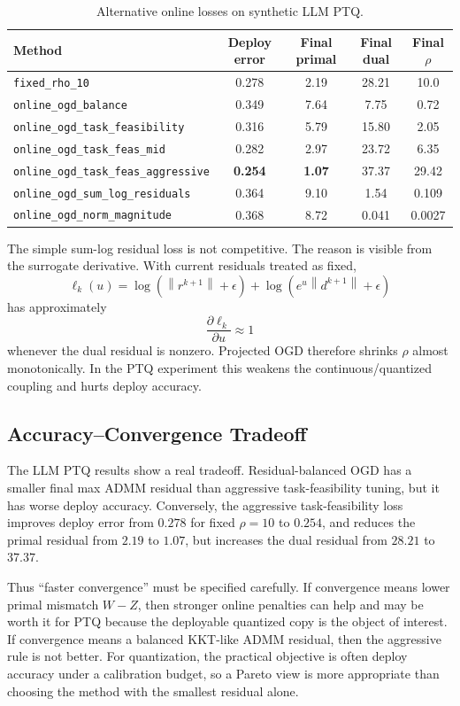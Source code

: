 \documentclass[11pt]{article}
\newcommand{\norm}[1]{\left\lVert #1 \right\rVert}
\begin{document}
\begin{table}[h]
\centering
\caption{Alternative online losses on synthetic LLM PTQ.}
\label{tab:llm-loss-sweep}
\begin{tabular}{lcccc}
\toprule
Method & Deploy error & Final primal & Final dual & Final \(\rho\)\\
\midrule
\texttt{fixed\_rho\_10} & 0.278 & 2.19 & 28.21 & 10.0\\
\texttt{online\_ogd\_balance} & 0.349 & 7.64 & 7.75 & 0.72\\
\texttt{online\_ogd\_task\_feasibility} & 0.316 & 5.79 & 15.80 & 2.05\\
\texttt{online\_ogd\_task\_feas\_mid} & 0.282 & 2.97 & 23.72 & 6.35\\
\texttt{online\_ogd\_task\_feas\_aggressive} & \textbf{0.254} & \textbf{1.07} & 37.37 & 29.42\\
\texttt{online\_ogd\_sum\_log\_residuals} & 0.364 & 9.10 & 1.54 & 0.109\\
\texttt{online\_ogd\_norm\_magnitude} & 0.368 & 8.72 & 0.041 & 0.0027\\
\bottomrule
\end{tabular}
\end{table}

The simple sum-log residual loss is not competitive.  The reason is visible
from the surrogate derivative.  With current residuals treated as fixed,
\[
    \ell_k(u)
    =
    \log(\norm{r^{k+1}}+\epsilon)
    +
    \log(e^u\norm{d^{k+1}}+\epsilon)
\]
has approximately
\[
    \frac{\partial \ell_k}{\partial u}\approx 1
\]
whenever the dual residual is nonzero.  Projected OGD therefore shrinks
\(\rho\) almost monotonically.  In the PTQ experiment this weakens the
continuous/quantized coupling and hurts deploy accuracy.

\subsection{Accuracy--Convergence Tradeoff}

The LLM PTQ results show a real tradeoff.  Residual-balanced OGD has a smaller
final max ADMM residual than aggressive task-feasibility tuning, but it has
worse deploy accuracy.  Conversely, the aggressive task-feasibility loss
improves deploy error from \(0.278\) for fixed \(\rho=10\) to \(0.254\), and
reduces the primal residual from \(2.19\) to \(1.07\), but increases the dual
residual from \(28.21\) to \(37.37\).

Thus ``faster convergence'' must be specified carefully.  If convergence means
lower primal mismatch \(W-Z\), then stronger online penalties can help and may
be worth it for PTQ because the deployable quantized copy is the object of
interest.  If convergence means a balanced KKT-like ADMM residual, then the
aggressive rule is not better.  For quantization, the practical objective is
often deploy accuracy under a calibration budget, so a Pareto view is more
appropriate than choosing the method with the smallest residual alone.
\end{document}
